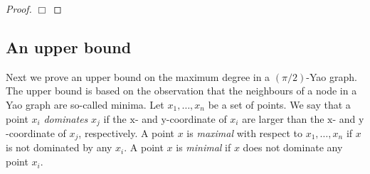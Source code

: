 \documentclass[10pt]{llncs}
\newcommand{\PROB}{\Pr}
\newcommand{\EXP}{\mathrm{E}}
\begin{document}
\begin{proof}
%
\hfill$\Box$\end{proof}

\subsection{An upper bound}

Next we prove an upper bound on the maximum degree in a $(\pi/2)$-Yao graph.
The upper bound is based on the observation that the neighbours of a node
in a Yao graph are so-called minima.  Let $x_1,\ldots,x_n$ be a set of
points. We say that a point $x_i$ \emph{dominates} $x_j$ if the
$\mathrm{x}$- and $\mathrm{y}$-coordinate of $x_i$ are larger than the
$\mathrm{x}$- and $\mathrm{y}$-coordinate of $x_j$, respectively.  A point
$x$ is \emph{maximal} with respect to $x_1,\ldots,x_n$ if $x$ is not
dominated by any $x_i$.  A point $x$ is \emph{minimal} if $x$ does not
dominate any point $x_i$.
\end{document}
